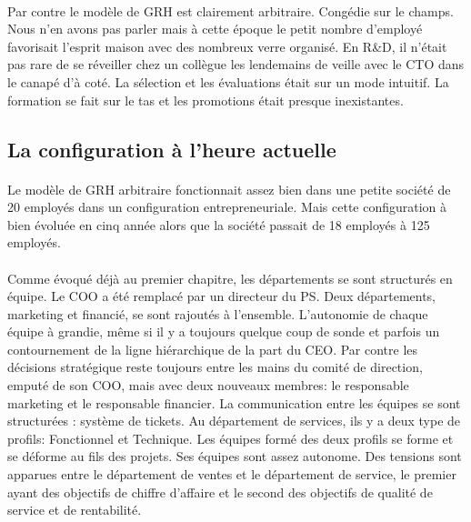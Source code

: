 \paragraph{}Par contre le modèle de GRH est clairement arbitraire\citep[pp. 115-119]{pichault}. Congédie sur le champs. Nous n'en avons pas parler mais à cette époque le petit nombre d'employé favorisait l'esprit maison avec des nombreux verre organisé. En R\&D, il n'était pas rare de se réveiller chez un collègue les lendemains de veille avec le CTO dans le canapé d'à coté. La sélection et les évaluations était sur un mode intuitif.  La formation se fait sur le tas et les promotions était presque inexistantes. 

\subsection{La configuration à l'heure actuelle}
\paragraph{} Le modèle de GRH arbitraire fonctionnait assez bien dans une petite société de 20 employés dans un configuration entrepreneuriale. Mais cette configuration à bien évoluée en cinq année alors que la société passait de 18 employés à 125 employés. 

\paragraph{} Comme évoqué déjà au premier chapitre, les départements se sont structurés en équipe. Le COO a été remplacé par un directeur du PS. Deux départements, marketing et financié, se sont rajoutés à l'ensemble. L'autonomie de chaque équipe à grandie, même si il y a toujours quelque coup de sonde et parfois un contournement de la ligne hiérarchique de la part du CEO. Par contre les décisions stratégique reste toujours entre les mains du comité de direction, emputé de son COO, mais avec deux nouveaux membres: le responsable marketing et le responsable financier. La communication entre les équipes se sont structurées : système de tickets. Au département de services, ils y a deux type de profils: Fonctionnel et Technique. Les équipes formé des deux profils se forme et se déforme au fils des projets. Ses équipes sont assez autonome. Des tensions sont apparues entre le département de ventes et le département de service, le premier ayant des objectifs de chiffre d'affaire et le second des objectifs de qualité de service et de rentabilité.

